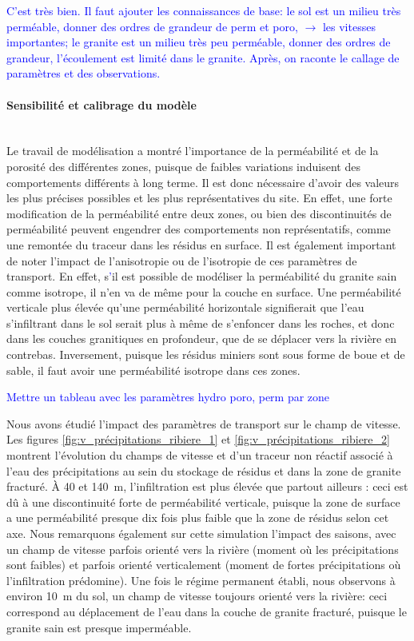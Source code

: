 \documentclass{article}
\newcommand{\blue}[1]{\textcolor{blue}{#1}} %
\begin{document}
\blue{C'est très bien. Il faut ajouter les connaissances de base: le sol est un milieu très perméable, donner des ordres de grandeur de perm et poro, $\rightarrow$ les vitesses importantes; le granite est un milieu très peu perméable, donner des ordres de grandeur, l'écoulement est limité dans le granite. Après, on raconte le callage de paramètres et des observations. }


\paragraph{Sensibilité et calibrage du modèle \\ \\}
Le travail de modélisation a montré l’importance de la perméabilité et de la porosité des différentes zones, puisque de faibles variations induisent des comportements différents à long terme. Il est donc nécessaire d’avoir des valeurs les plus précises possibles et les plus représentatives du site. En effet, une forte modification de la perméabilité entre deux zones, ou bien des discontinuités de perméabilité peuvent engendrer des comportements non représentatifs, comme une remontée du traceur dans les résidus en surface. Il est également important de noter l'impact de l'anisotropie ou de l'isotropie de ces paramètres de transport. En effet, s\blue{'}il est possible de modéliser la perméabilité du granite sain comme isotrope, il n'en va de même pour la couche en surface. Une perméabilité verticale plus élevée qu'une perméabilité horizontale signifierait que l'eau s'infiltrant dans le sol serait plus à même de s'enfoncer dans les roches, et donc dans les couches granitiques en profondeur, que de se déplacer vers la rivière en contrebas. Inversement, puisque les résidus miniers sont sous forme de boue et de sable, il faut avoir une perméabilité isotrope dans ces zones.

\blue{Mettre un tableau avec les paramètres hydro poro, perm par zone}

Nous avons étudié l'impact des paramètres de transport sur le champ de vitesse. Les figures \ref{fig:v_précipitations_ribiere_1} et \ref{fig:v_précipitations_ribiere_2} montrent l'évolution du champs de vitesse et d'un traceur non réactif associé à l'eau des précipitations au sein du stockage de résidus et dans la zone de granite fracturé. À 40 et 140~m, l'infiltration est plus élevée que partout ailleurs : ceci est dû à une discontinuité forte de perméabilité verticale, puisque la zone de surface a une perméabilité presque dix fois plus faible que la zone de résidus selon cet axe. Nous remarquons également sur cette simulation l'impact des saisons, avec un champ de vitesse parfois orienté vers la rivière (moment où les précipitations sont faibles) et parfois orienté verticalement (moment de fortes précipitations où l'infiltration prédomine). Une fois le régime permanent établi, nous observons à environ 10~m du sol, un champ de vitesse toujours orienté vers la rivière: ceci correspond au déplacement de l'eau dans la couche de granite fracturé, puisque le granite sain est presque imperméable.
\end{document}
